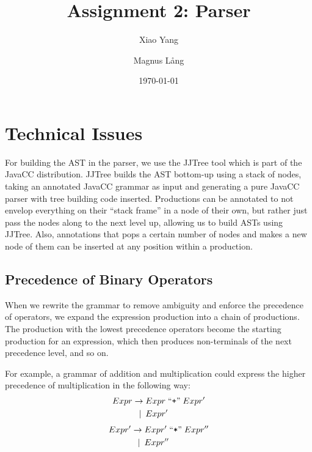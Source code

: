 \documentclass[a4paper,11pt]{article}
\title{Assignment 2: Parser}
\author{Xiao Yang \and Magnus L{\aa}ng} %
\date{\today}
\begin{document}
\maketitle

\section{Technical Issues}
For building the AST in the parser, we use the JJTree tool which is part of the JavaCC distribution.
JJTree builds the AST bottom-up using a stack of nodes, taking an annotated JavaCC grammar as input and generating a pure JavaCC parser with tree building code inserted.
Productions can be annotated to not envelop everything on their ``stack frame'' in a node of their own, but rather just pass the nodes along to the next level up, allowing us to build ASTs using JJTree.
Also, annotations that pops a certain number of nodes and makes a new node of them can be inserted at any position within a production.

\subsection{Precedence of Binary Operators}
When we rewrite the grammar to remove ambiguity and enforce the precedence of operators, we expand the expression production into a chain of productions.
The production with the lowest precedence operators become the starting production for an expression, which then produces non-terminals of the next precedence level, and so on.

For example, a grammar of addition and multiplication could express the higher precedence of multiplication in the following way:
\begin{align*}
  Expr \rightarrow &\; Expr \;\text{``\texttt{+}''}\; Expr' \\
       \mid \:     &\; Expr'
\end{align*}
\begin{align*}
  Expr' \rightarrow &\; Expr' \;\text{``\texttt{*}''}\; Expr'' \\
        \mid \:     &\; Expr''
\end{align*}
\end{document}
